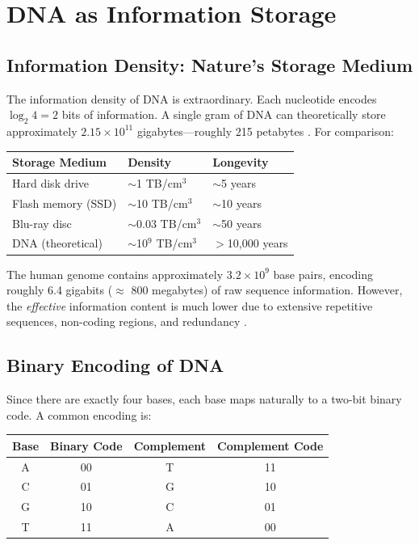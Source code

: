 \section{DNA as Information Storage}
\label{sec:dna-information-storage}

\subsection{Information Density: Nature's Storage Medium}

The information density of DNA is extraordinary. Each nucleotide encodes $\log_2 4 = 2$ bits of information. A single gram of DNA can theoretically store approximately $2.15 \times 10^{11}$ gigabytes---roughly 215 petabytes \citep{church2012}. For comparison:

\begin{center}
\renewcommand{\arraystretch}{1.15}
\begin{tabularx}{0.85\textwidth}{L{3.5cm} R{3cm} Y}
\toprule
\textbf{Storage Medium} & \textbf{Density} & \textbf{Longevity} \\
\midrule
Hard disk drive & $\sim$1 TB/cm$^3$ & $\sim$5 years \\
Flash memory (SSD) & $\sim$10 TB/cm$^3$ & $\sim$10 years \\
Blu-ray disc & $\sim$0.03 TB/cm$^3$ & $\sim$50 years \\
DNA (theoretical) & $\sim$10$^9$ TB/cm$^3$ & $>$10,000 years \\
\bottomrule
\end{tabularx}
\end{center}

The human genome contains approximately $3.2 \times 10^9$ base pairs, encoding roughly 6.4 gigabits ($\approx$ 800 megabytes) of raw sequence information. However, the \emph{effective} information content is much lower due to extensive repetitive sequences, non-coding regions, and redundancy \citep{voss1992}.

\subsection{Binary Encoding of DNA}

Since there are exactly four bases, each base maps naturally to a two-bit binary code. A common encoding is:

\begin{center}
\renewcommand{\arraystretch}{1.2}
\begin{tabular}{cccc}
\toprule
\textbf{Base} & \textbf{Binary Code} & \textbf{Complement} & \textbf{Complement Code} \\
\midrule
A & 00 & T & 11 \\
C & 01 & G & 10 \\
G & 10 & C & 01 \\
T & 11 & A & 00 \\
\bottomrule
\end{tabular}
\end{center}

